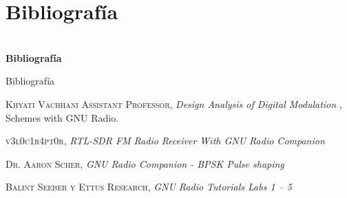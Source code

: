 
\section{Bibliografía}

\begin{frame}{}


\bfseries{\textrm{\LARGE \\Bibliografía}}
\raggedright
\end{frame}



\begin{frame}{Bibliografía}


\begin{thebibliography}{X}

 \textsc{Khyati Vachhani Assistant Professor}, 
\textit{Design Analysis of Digital Modulation }, Schemes with GNU Radio.


 \textsc{v3l0c1r4pt0r}, 
\textit{RTL-SDR FM Radio Receiver With GNU Radio Companion }


 \textsc{ Dr. Aaron Scher}, 
\textit{GNU Radio Companion - BPSK Pulse shaping}

 \textsc{ Balint Seeber y
Ettus Research}, 
\textit{GNU Radio Tutorials
Labs 1 – 5}

\end{thebibliography}
\end{frame}